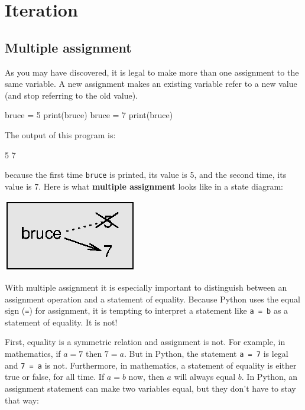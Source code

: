 \chapter{Iteration}


\section{Multiple assignment}


As you may have discovered, it is legal to
make more than one assignment to the same variable.  A
new assignment makes an existing variable refer to a new
value (and stop referring to the old value).

\beforeverb
\begin{pycode}
bruce = 5
print(bruce)
bruce = 7
print(bruce)
\end{pycode}
\afterverb
%
The output of this program is:
\beforeverb
\begin{pyoutput}
5
7
\end{pyoutput}
\afterverb
%
because the first time {\tt bruce} is printed, its value is 5, and the second time, its
value is 7.  Here is what {\bf multiple assignment} looks like in a state diagram:


\beforefig
\centerline{\includegraphics{figs/assign2.eps}}
\afterfig

With multiple assignment it is especially important to distinguish
between an assignment operation and a statement of equality.  Because
Python uses the equal sign ({\tt =}) for assignment, it is tempting to
interpret a statement like {\tt a = b} as a statement of equality. It
is not!


First, equality is a symmetric relation and assignment is not.  For
example, in mathematics, if $a = 7$ then $7 = a$.  But in Python, the
statement {\tt a = 7} is legal and {\tt 7 = a} is not.
%
Furthermore, in mathematics, a statement of equality is either true or
false, for all time.  If $a = b$ now, then $a$ will always equal $b$.
In Python, an assignment statement can make two variables equal, but
they don't have to stay that way:

